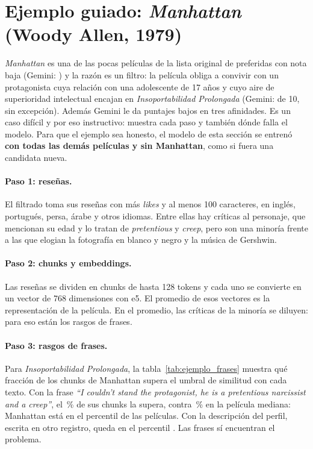 \documentclass[11pt,a4paper]{article}
\begin{document}
\section{Ejemplo guiado: \emph{Manhattan} (Woody Allen, 1979)}\label{sec:ejemplo}

\emph{Manhattan} es una de las pocas películas de la lista original de preferidas con nota baja (Gemini:
\EjNotaGemini) y la razón es un filtro: la película obliga a convivir con un protagonista cuya relación con una adolescente de 17 años y cuyo aire de
superioridad intelectual encajan en \emph{Insoportabilidad Prolongada} (Gemini: \EjInsGemini{} de 10, sin excepción).
Además Gemini le da puntajes bajos en tres afinidades. Es un caso difícil y por eso instructivo: muestra cada paso y
también dónde falla el modelo. Para que el ejemplo sea honesto, el modelo de esta sección se entrenó \textbf{con todas
las demás películas y sin Manhattan}, como si fuera una candidata nueva.

\paragraph{Paso 1: reseñas.} El filtrado toma sus \EjResenias{} reseñas con más \emph{likes} y al menos 100 caracteres,
en inglés, portugués, persa, árabe y otros idiomas. Entre ellas hay críticas al personaje, que mencionan su edad y lo
tratan de \emph{pretentious} y \emph{creep}, pero son una minoría frente a las que elogian la fotografía en blanco y negro
y la música de Gershwin.

\paragraph{Paso 2: chunks y embeddings.} Las reseñas se dividen en \EjChunks{} chunks de hasta 128 tokens y cada uno se
convierte en un vector de 768 dimensiones con e5. El promedio de esos vectores es la representación de la película. En
el promedio, las críticas de la minoría se diluyen: para eso están los rasgos de frases.

\paragraph{Paso 3: rasgos de frases.} Para \emph{Insoportabilidad Prolongada}, la tabla~\ref{tab:ejemplo_frases} muestra
qué fracción de los chunks de Manhattan supera el umbral de similitud con cada texto. Con la frase \emph{``I couldn't
stand the protagonist, he is a pretentious narcissist and a creep''}, el \EjFraseManhattan\,\% de sus chunks la supera,
contra \EjFraseMediana\,\% en la película mediana: Manhattan está en el percentil \EjFrasePercentil{} de las \NPeliculasCV{} películas.
Con la descripción del perfil, escrita en otro registro, queda en el percentil \EjDescPercentil. Las frases sí encuentran
el problema.
\end{document}
